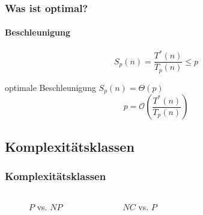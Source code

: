 \begin{frame}
    \frametitle{Was ist optimal?}
    \framesubtitle{Beschleunigung}
    \begin{definition}[Beschleunigung]
        \begin{equation}
            S_p(n) = \frac{T^\ast(n)}{T_p(n)} \leq p
        \end{equation}
    \end{definition}
    \begin{block}{optimale Beschleunigung $S_p(n) = \Theta(p)$}
        \begin{equation}
            p = \mathcal{O} \left( \frac{T^\ast(n)}{T_p(n)} \right)
        \end{equation}
    \end{block}
    
\end{frame}

\subsection{Komplexitätsklassen}
\begin{frame}
    \frametitle{Komplexitätsklassen}
    \begin{columns}
        \begin{figure}
            \centering
            
            \caption{$P$ vs. $NP$}
        \end{figure}
        \pause
        \begin{figure}
            \centering
            
            \caption{$NC$ vs. $P$}
        \end{figure}
    \end{columns}
\end{frame}

